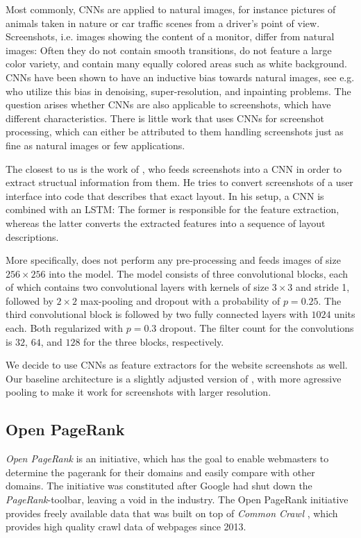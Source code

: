 Most commonly, CNNs are applied to natural images, for instance pictures of animals taken in nature or car traffic scenes from a driver's point of view.
Screenshots, i.e. images showing the content of a monitor, differ from natural images: Often they do not contain smooth transitions, do not feature a large color variety, and contain many equally colored areas such as white background.
CNNs have been shown to have an inductive bias towards natural images, see e.g. \cite{deepimageprior} who utilize this bias in denoising, super-resolution, and inpainting problems.
The question arises whether CNNs are also applicable to screenshots, which have different characteristics. There is little work that uses CNNs for screenshot processing, which can either be attributed to them handling screenshots just as fine as natural images or few applications.

The closest to us is the work of \cite{beltramelli:pix2code}, who feeds screenshots into a CNN in order to extract structual information from them. He tries to convert screenshots of a user interface into code that describes that exact layout. In his setup, a CNN is combined with an LSTM: The former is responsible for the feature extraction, whereas the latter converts the extracted features into a sequence of layout descriptions.

More specifically, \cite{beltramelli:pix2code} does not perform any pre-processing and feeds images of size $256\times 256$ into the model. The model consists of three convolutional blocks, each of which contains two convolutional layers with kernels of size $3\times 3$ and stride 1, followed by $2\times 2$ max-pooling and dropout with a probability of $p=0.25$. The third convolutional block is followed by two fully connected layers with $1024$ units each. Both regularized with $p=0.3$ dropout. The filter count for the convolutions is $32$, $64$, and $128$ for the three blocks, respectively.

We decide to use CNNs as feature extractors for the website screenshots as well. Our baseline architecture is a slightly adjusted version of \cite{beltramelli:pix2code}, with more agressive pooling to make it work for screenshots with larger resolution.

\subsection{Open PageRank}
\label{OpenPageRank}
\textit{Open PageRank} \cite{OpenPageRank} is an initiative, which has the goal to enable webmasters to determine the pagerank for their domains and easily compare with other domains. The initiative was constituted after Google had shut down the \textit{PageRank}-toolbar, leaving a void in the industry. The Open PageRank initiative provides freely available data that was built on top of \textit{Common Crawl} \cite{CommonCrawl}, which provides high quality crawl data of webpages since 2013.

